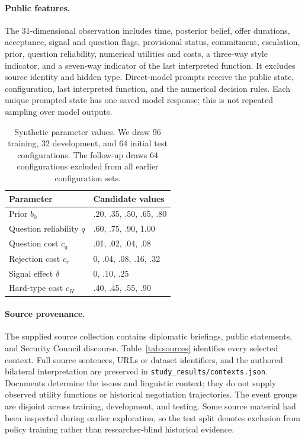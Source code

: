 \paragraph{Public features.}
The 31-dimensional observation includes time, posterior belief, offer durations, acceptance, signal and question flags, provisional status, commitment, escalation, prior, question reliability, numerical utilities and costs, a three-way style indicator, and a seven-way indicator of the last interpreted function. It excludes source identity and hidden type. Direct-model prompts receive the public state, configuration, last interpreted function, and the numerical decision rules. Each unique prompted state has one saved model response; this is not repeated sampling over model outputs.

\begin{table}[t]
\centering\small
\begin{tabular}{ll}
\toprule
Parameter & Candidate values \\
\midrule
Prior $b_0$ & .20, .35, .50, .65, .80 \\
Question reliability $q$ & .60, .75, .90, 1.00 \\
Question cost $c_q$ & .01, .02, .04, .08 \\
Rejection cost $c_r$ & 0, .04, .08, .16, .32 \\
Signal effect $\delta$ & 0, .10, .25 \\
Hard-type cost $c_H$ & .40, .45, .55, .90 \\
\bottomrule
\end{tabular}
\caption{Synthetic parameter values. We draw 96 training, 32 development, and 64 initial test configurations. The follow-up draws 64 configurations excluded from all earlier configuration sets.}
\end{table}

\paragraph{Source provenance.}
The supplied source collection contains diplomatic briefings, public statements, and Security Council discourse. Table~\ref{tab:sources} identifies every selected context. Full source sentences, URLs or dataset identifiers, and the authored bilateral interpretation are preserved in \texttt{study\_results/contexts.json}. Documents determine the issues and linguistic context; they do not supply observed utility functions or historical negotiation trajectories. The event groups are disjoint across training, development, and testing. Some source material had been inspected during earlier exploration, so the test split denotes exclusion from policy training rather than researcher-blind historical evidence.

